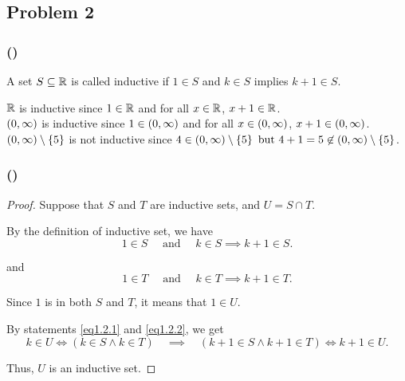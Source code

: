 \subsection{Problem 2}
\subsubsection{()}
\begin{definition}
    A set $S \subseteq \mathbb{R}$ is called inductive if $1 \in S$ and $k \in S$ implies $k + 1 \in S$. 
\end{definition}

$\mathbb{R}$ is inductive since $1 \in \mathbb{R}$ and for all $x \in \mathbb{R}$, $x + 1 \in \mathbb{R}$. \\

$\left(0, \infty\right)$ is inductive since $1 \in \left(0, \infty\right)$ and for all $x \in \left(0, \infty\right)$, $x + 1 \in \left(0, \infty\right)$. \\

$\left(0, \infty\right) \setminus \left\{5\right\}$ is not inductive since $4 \in \left(0, \infty\right) \setminus \left\{5\right\} \text{ but } 4 + 1 = 5 \not\in \left(0, \infty\right) \setminus \left\{5\right\}$. 

\newpage
\subsubsection{()}
\begin{proof}
    Suppose that $S$ and $T$ are inductive sets, and $U = S \cap T$. 

    By the definition of inductive set, we have 
    \begin{equation} \label{eq1.2.1}
        1 \in S \quad \text{ and } \quad k \in S \implies k + 1 \in S. 
    \end{equation}

    and 
    \begin{equation} \label{eq1.2.2}
        1 \in T \quad \text{ and } \quad k \in T \implies k + 1 \in T. 
    \end{equation}

    Since $1$ is in both $S$ and $T$, it means that $1 \in U$. 

    By statements \eqref{eq1.2.1} and \eqref{eq1.2.2}, we get 
    \begin{equation*}
        k \in U
        \iff (k \in S \wedge k \in T) \quad
        \implies \quad (k+1 \in S \wedge k+1 \in T)
        \iff k+1 \in U.
    \end{equation*}

    Thus, $U$ is an inductive set. 
\end{proof}

